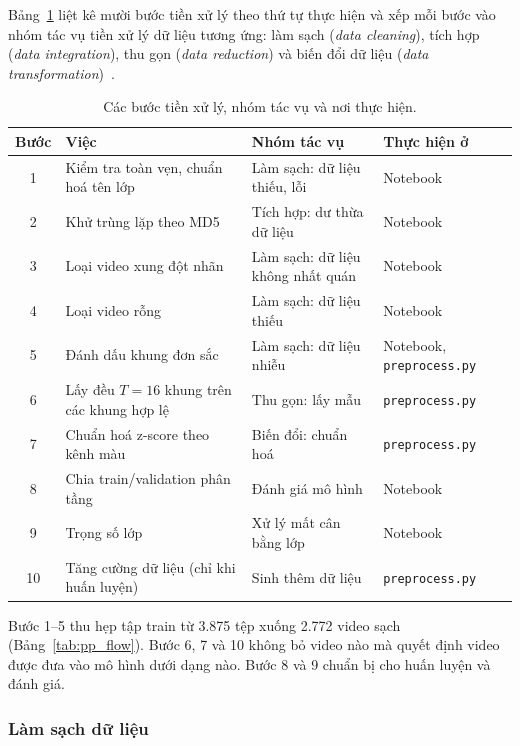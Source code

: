 Bảng~\ref{tab:pp_overview} liệt kê mười bước tiền xử lý theo thứ tự thực hiện và xếp mỗi bước vào nhóm tác vụ tiền xử lý dữ liệu tương ứng: làm sạch (\textit{data cleaning}), tích hợp (\textit{data integration}), thu gọn (\textit{data reduction}) và biến đổi dữ liệu (\textit{data transformation})~\cite{han2022}.

\begin{table}[H]
  \centering
  \caption{Các bước tiền xử lý, nhóm tác vụ và nơi thực hiện.}
  \label{tab:pp_overview}
  \small
  \begin{tabular}{@{}cp{}p{}p{}@{}}
    \toprule
    \textbf{Bước} & \textbf{Việc} & \textbf{Nhóm tác vụ} & \textbf{Thực hiện ở} \\
    \midrule
    1  & Kiểm tra toàn vẹn, chuẩn hoá tên lớp & Làm sạch: dữ liệu thiếu, lỗi & Notebook \\
    2  & Khử trùng lặp theo MD5 & Tích hợp: dư thừa dữ liệu & Notebook \\
    3  & Loại video xung đột nhãn & Làm sạch: dữ liệu không nhất quán & Notebook \\
    4  & Loại video rỗng & Làm sạch: dữ liệu thiếu & Notebook \\
    5  & Đánh dấu khung đơn sắc & Làm sạch: dữ liệu nhiễu & Notebook, \texttt{preprocess.py} \\
    6  & Lấy đều $T=16$ khung trên các khung hợp lệ & Thu gọn: lấy mẫu & \texttt{preprocess.py} \\
    7  & Chuẩn hoá z-score theo kênh màu & Biến đổi: chuẩn hoá & \texttt{preprocess.py} \\
    8  & Chia train/validation phân tầng & Đánh giá mô hình & Notebook \\
    9  & Trọng số lớp & Xử lý mất cân bằng lớp & Notebook \\
    10 & Tăng cường dữ liệu (chỉ khi huấn luyện) & Sinh thêm dữ liệu & \texttt{preprocess.py} \\
    \bottomrule
  \end{tabular}
\end{table}

Bước 1--5 thu hẹp tập train từ 3.875 tệp xuống 2.772 video sạch (Bảng~\ref{tab:pp_flow}). Bước 6, 7 và 10 không bỏ video nào mà quyết định video được đưa vào mô hình dưới dạng nào. Bước 8 và 9 chuẩn bị cho huấn luyện và đánh giá.

\subsubsection{Làm sạch dữ liệu}
\label{subsec:pp_clean}


